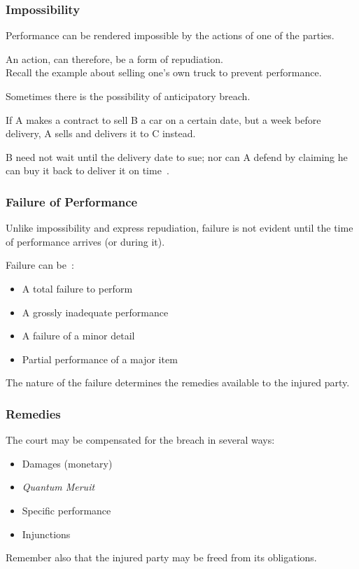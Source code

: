 \begin{frame}
\frametitle{Impossibility}

Performance can be rendered impossible by the actions of one of the parties.

An action, can therefore, be a form of repudiation.\\
\quad Recall the example about selling one's own truck to prevent performance.

Sometimes there is the possibility of \alert{anticipatory breach}.

If A makes a contract to sell B a car on a certain date, but a week before delivery, A sells and delivers it to C instead.

B need not wait until the delivery date to sue; nor can A defend by claiming he can buy it back to deliver it on time~\cite{lba}.

\end{frame}

\begin{frame}
\frametitle{Failure of Performance}

Unlike impossibility and express repudiation, failure is not evident until the time of performance arrives (or during it).

Failure can be~\cite{lba}:

\begin{itemize}
	\item A total failure to perform
	\item A grossly inadequate performance
	\item A failure of a minor detail
	\item Partial performance of a major item
\end{itemize}

The nature of the failure determines the remedies available to the injured party.

\end{frame}



\begin{frame}
\frametitle{Remedies}

The court may be compensated for the breach in several ways:

\begin{itemize}
	\item Damages (monetary)
	\item \textit{Quantum Meruit} 
	\item Specific performance
	\item Injunctions
\end{itemize}

Remember also that the injured party may be freed from its obligations.

\end{frame}



